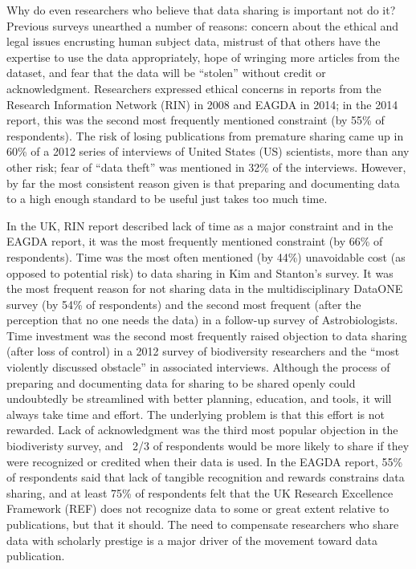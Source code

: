 \documentclass[10pt]{article}
\begin{document}
Why do even researchers who believe that data sharing is important not do it?
Previous surveys unearthed a number of reasons: concern about the ethical and legal issues encrusting human subject data, mistrust of that others have the expertise to use the data appropriately, hope of wringing more articles from the dataset, and fear that the data will be ``stolen'' without credit or acknowledgment.
Researchers expressed ethical concerns in reports from the Research Information Network (RIN) in 2008 and EAGDA in 2014; in the 2014 report, this was the second most frequently mentioned constraint (by 55\% of respondents)\cite{swann_share_2008, bobrow_establishing_2014}.
The risk of losing publications from premature sharing came up in 60\% of a 2012 series of interviews of United States (US) scientists, more than any other risk; fear of ``data theft'' was mentioned in 32\% of the interviews\cite{kim_institutional_2012}.
However, by far the most consistent reason given is that preparing and documenting data to a high enough standard to be useful just takes too much time.

In the UK, RIN report described lack of time as a major constraint\cite{swan_share_2008} and in the EAGDA report, it was the most frequently mentioned constraint (by 66\% of respondents)\cite{bobrow_establishing_2014}.
Time was the most often mentioned (by 44\%) unavoidable cost (as opposed to potential risk) to data sharing in Kim and Stanton's survey\cite{kim_institutional_2012}.
It was the most frequent reason for not sharing data in the multidisciplinary DataONE survey (by 54\% of respondents)\cite{tenopir_data_2011} and the second most frequent (after the perception that no one needs the data) in a follow-up survey of Astrobiologists\cite{aydingolu_data_2014}.
Time investment was the second most frequently raised objection to data sharing (after loss of control) in a 2012 survey of biodiversity researchers and the ``most violently discussed obstacle'' in associated interviews\cite{enke_user's_2012}.
Although the process of preparing and documenting data for sharing to be shared openly could undoubtedly be streamlined with better planning, education, and tools, it will always take time and effort.
The underlying problem is that this effort is not rewarded.
Lack of acknowledgment was the third most popular objection in the biodiveristy survey, and ~2/3 of respondents would be more likely to share if they were recognized or credited when their data is used.
In the EAGDA report, 55\% of respondents said that lack of tangible recognition and rewards constrains data sharing, and at least 75\% of respondents felt that the UK Research Excellence Framework (REF) does not recognize data to some or great extent relative to publications, but that it should.
The need to compensate researchers who share data with scholarly prestige is a major driver of the movement toward data publication.
 
\end{document}
